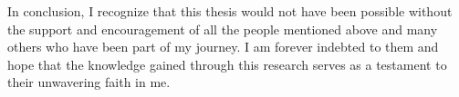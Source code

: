 \begin{Acknowledgements}
In conclusion, I recognize that this thesis would not have been possible without the support and encouragement of all the people mentioned above and many others who have been part of my journey. I am forever indebted to them and hope that the knowledge gained through this research serves as a testament to their unwavering faith in me.




	
	
	
	
	
	
	
	
	
	 
	
	
	
	
	
	
\end{Acknowledgements}
\cleardoublepage